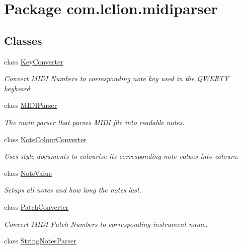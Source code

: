 \hypertarget{namespacecom_1_1lclion_1_1midiparser}{\section{Package com.\+lclion.\+midiparser}
\label{namespacecom_1_1lclion_1_1midiparser}
}
\subsection*{Classes}
\begin{DoxyCompactItemize}
\item 
class \hyperlink{classcom_1_1lclion_1_1midiparser_1_1_key_converter}{Key\+Converter}
\begin{DoxyCompactList}\small\item\em Convert M\+I\+D\+I Numbers to corresponding note key used in the Q\+W\+E\+R\+T\+Y keyboard. \end{DoxyCompactList}\item 
class \hyperlink{classcom_1_1lclion_1_1midiparser_1_1_m_i_d_i_parser}{M\+I\+D\+I\+Parser}
\begin{DoxyCompactList}\small\item\em The main parser that parses M\+I\+D\+I file into readable notes. \end{DoxyCompactList}\item 
class \hyperlink{classcom_1_1lclion_1_1midiparser_1_1_note_colour_converter}{Note\+Colour\+Converter}
\begin{DoxyCompactList}\small\item\em Uses style documents to colourise its corresponding note values into colours. \end{DoxyCompactList}\item 
class \hyperlink{classcom_1_1lclion_1_1midiparser_1_1_note_value}{Note\+Value}
\begin{DoxyCompactList}\small\item\em Setups all notes and how long the notes last. \end{DoxyCompactList}\item 
class \hyperlink{classcom_1_1lclion_1_1midiparser_1_1_patch_converter}{Patch\+Converter}
\begin{DoxyCompactList}\small\item\em Convert M\+I\+D\+I Patch Numbers to corresponding instrument name. \end{DoxyCompactList}\item 
class \hyperlink{classcom_1_1lclion_1_1midiparser_1_1_string_notes_parser}{String\+Notes\+Parser}
\end{DoxyCompactItemize}
